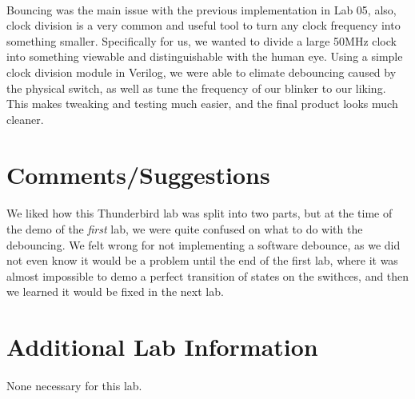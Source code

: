 \documentclass[12pt]{report}
\begin{document}
	\paragraph{}
			Bouncing was the main issue with the previous implementation in Lab 05, also, clock division is a very common and useful tool to turn any clock frequency into something smaller. Specifically for us, we wanted to divide a large 50MHz clock into something viewable and distinguishable with the human eye. Using a simple clock division module in Verilog, we were able to elimate debouncing caused by the physical switch, as well as tune the frequency of our blinker to our liking. This makes tweaking and testing much easier, and the final product looks much cleaner. 
\section*{Comments/Suggestions}
	\paragraph{}
		We liked how this Thunderbird lab was split into two parts, but at the time of the demo of the \textit{first} lab, we were quite confused on what to do with the debouncing. We felt wrong for not implementing a software debounce, as we did not even know it would be a problem until the end of the first lab, where it was almost impossible to demo a perfect transition of states on the swithces, and then we learned it would be fixed in the next lab.
\section*{Additional Lab Information}
	\paragraph{}
		None necessary for this lab.
			
		
\end{document}
